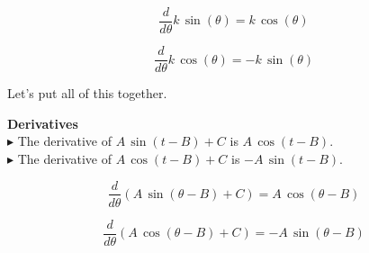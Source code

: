 \documentclass{ximera}
\begin{document}
\begin{notation}

\[
\frac{d}{d\theta} k \, \sin(\theta) = k \, \cos(\theta)
\]

\[
\frac{d}{d\theta} k \, \cos(\theta) = -k \, \sin(\theta)
\]

\end{notation}








Let's put all of this together.







\begin{theorem} \textbf{\textcolor{green!50!black}{Derivatives}}  \\

$\blacktriangleright$ The derivative of \textbf{\textcolor{purple!85!blue}{$A \, \sin(t - B) + C$}} is \textbf{\textcolor{blue!55!black}{$A \, \cos(t - B)$}}. \\

$\blacktriangleright$ The derivative of \textbf{\textcolor{purple!85!blue}{$A \, \cos(t - B) + C$}} is \textbf{\textcolor{blue!55!black}{$-A \, \sin(t - B)$}}. \\

\end{theorem}






\begin{notation}

\[
\frac{d}{d\theta} (A \, \sin(\theta - B) + C) = A \, \cos(\theta - B)
\]

\[
\frac{d}{d\theta} (A \, \cos(\theta - B) + C) = -A \, \sin(\theta - B)
\]

\end{notation}
\end{document}
